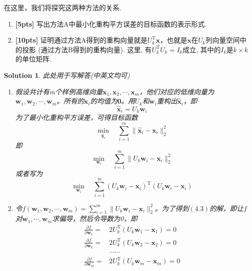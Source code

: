 \documentclass[a4paper,UTF8]{article}
\numberwithin{equation}{section}
\newtheorem*{mySol}{Solution}
\begin{document}
在这里，我们将探究这两种方法的关系.
\begin{enumerate}[(1)]
	\item \textbf{[5pts]} 写出方法A中最小化重构平方误差的目标函数的表示形式.
	\item \textbf{[10pts]} 证明通过方法A得到的重构向量就是$U_k^\mathrm{T}\mathbf{x}$，也就是$\mathbf{x}$在$U_k$列向量空间中的投影 (通过方法B得到的重构向量). 这里, 有$U_k^\mathrm{T}U_k=I_k$成立, 其中的$I_k$是$k\times k$的单位矩阵.
\end{enumerate}
\begin{mySol}
	此处用于写解答(中英文均可)
\begin{enumerate}[(1)]
\item 
假设共计有m个样例高维向量$\mathbf{x}_1,\mathbf{x}_2,\cdots,\mathbf{x}_m$，他们对应的低维向量为$\mathbf{w}_1,\mathbf{w}_2,\cdots,\mathbf{w}_m$。所有的$\mathbf{x}_i$的均值为$\mathbf{0}$。用$U_k$和$\mathbf{w}_i$重构出$\hat{\mathbf{x}}_i$，即
\begin{equation}
\hat{\mathbf{x}}_i = U_k\mathbf{w}_i
\end{equation}
为了最小化重构平方误差，可得目标函数
\begin{equation}
\min_{\hat{\mathbf{x}}_i} \quad \sum_{i=1}^{m}\lVert \hat{\mathbf{x}}_i - \mathbf{x}_i\rVert_2^2	
\end{equation}
即
\begin{equation}
\min_{\mathbf{w}_i} \quad \sum_{i=1}^{m}\lVert U_k\mathbf{w}_i - \mathbf{x}_i\rVert_2^2	
\end{equation}
或者写为
\begin{equation}
\min_{\mathbf{w}_i} \quad \sum_{i=1}^{m}(U_k\mathbf{w}_i - \mathbf{x}_i)^\mathrm{T}(U_k\mathbf{w}_i - \mathbf{x}_i)
\end{equation}
\item 
令$f(\mathbf{w}_1,\mathbf{w}_2,\cdots,\mathbf{w}_m)=\sum_{i=1}^{m}\lVert U_k\mathbf{w}_i - \mathbf{x}_i\rVert_2^2$。为了得到$(4.3)$的解，即让$f$对$\mathbf{w}_1,\cdots,\mathbf{w}_m$求偏导，然后令导数为0，即
\begin{equation}
\begin{aligned}
\frac{\partial f}{\partial \mathbf{w}_1} =& 2U_k^\mathrm{T}(U_k\mathbf{w}_1 - \mathbf{x}_1)=0\\
\frac{\partial f}{\partial \mathbf{w}_2} =& 2U_k^\mathrm{T}(U_k\mathbf{w}_2 - \mathbf{x}_2)=0\\
&\cdots\cdots\\
\frac{\partial f}{\partial \mathbf{w}_m} =& 2U_k^\mathrm{T}(U_k\mathbf{w}_m - \mathbf{x}_m)=0\\

\end{aligned}
\end{equation}
\end{enumerate}
\end{mySol}
\end{document}
